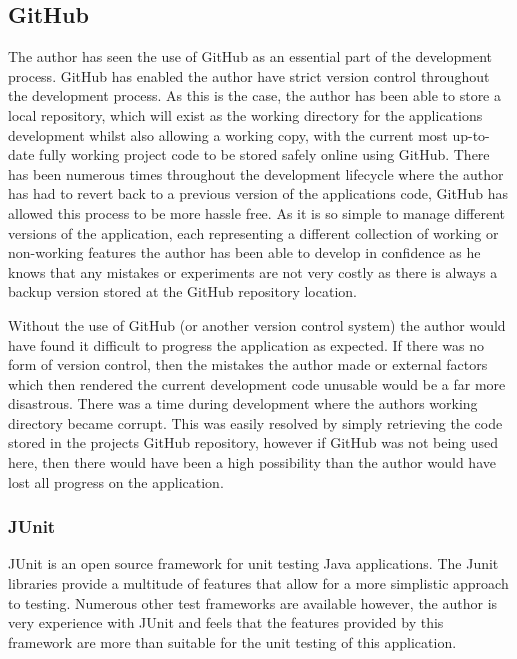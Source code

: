 \subsection{GitHub}

The author has seen the use of GitHub as an essential part of the development process. GitHub has enabled the author have strict version control throughout the development process. As this is the case, the author has been able to store a local repository, which will exist as the working directory for the applications development whilst also allowing a working copy, with the current most up-to-date fully working project code to be stored safely online using GitHub. There has been numerous times throughout the development lifecycle where the author has had to revert back to a previous version of the applications code, GitHub has allowed this process to be more hassle free. As it is so simple to manage different versions of the application, each representing a different collection of working or non-working features the author has been able to develop in confidence as he knows that any mistakes or experiments are not very costly as there is always a backup version stored at the GitHub repository location.

Without the use of GitHub (or another version control system) the author would have found it difficult to progress the application as expected. If there was no form of version control, then the mistakes the author made or external factors which then rendered the current development code unusable would be a far more disastrous. There was a time during development where the authors working directory became corrupt. This was easily resolved by simply retrieving the code stored in the projects GitHub repository, however if GitHub was not being used here, then there would have been a high possibility than the author would have lost all progress on the application.

\subsubsection{JUnit}
\label{junitsupport}

JUnit is an open source framework for unit testing Java applications. The Junit libraries provide a multitude of features that allow for a more simplistic approach to testing. Numerous other test frameworks are available however, the author is very experience with JUnit and feels that the features provided by this framework are more than suitable for the unit testing of this application.

